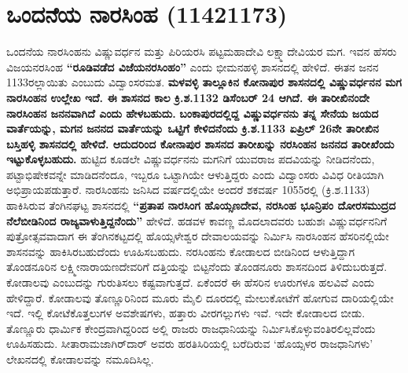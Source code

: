 \section{ಒಂದನೆಯ ನಾರಸಿಂಹ (11421173)}

ಒಂದನೆಯ ನಾರಸಿಂಹನು ವಿಷ್ಣುವರ್ಧನ ಮತ್ತು ಪಿರಿಯರಸಿ ಪಟ್ಟಮಹಾದೇವಿ ಲಕ್ಷ್ಮಾದೇವಿಯರ ಮಗ. ಇವನ ಹೆಸರು ವಿಜಯನರಸಿಂಹ \textbf{“ರೂಡಿವಡೆದ ವಿಜೆಯನರಸಿಂಹಂ”} ಎಂದು ಭೀಮನಹಳ್ಳಿ ಶಾಸನದಲ್ಲಿ ಹೇಳಿದೆ. ಈತನ ಜನನ 1133ರಲ್ಲಾಯಿತು ಎಂಬುದು ವಿದ್ವಾಂಸರಮತ. \textbf{ಮಳವಳ್ಳಿ ತಾಲ್ಲೂಕಿನ ಕೋನಾಪುರ ಶಾಸನದಲ್ಲಿ ವಿಷ್ಣುವರ್ಧನನ ಮಗ ನಾರಸಿಂಹನ ಉಲ್ಲೇಖ ಇದೆ. ಈ ಶಾಸನದ ಕಾಲ ಕ್ರಿ.ಶ.1132 ಡಿಸೆಂಬರ್​ 24 ಆಗಿದೆ. ಈ ತಾರೀಖಿನಂದೇ ನಾರಸಿಂಹನ ಜನನವಾಗಿದೆ ಎಂದು ಹೇಳಬಹುದು.} \textbf{ಬಂಕಾಪುರದಲ್ಲಿದ್ದ ವಿಷ್ಣುವರ್ಧನನು ತನ್ನ ಸೇನೆಯ ಜಯದ ವಾರ್ತೆಯನ್ನು, ಮಗನ ಜನನದ ವಾರ್ತೆಯನ್ನು ಒಟ್ಟಿಗೆ ಕೇಳಿದನೆಂದು ಕ್ರಿ.ಶ.1133 ಏಪ್ರಿಲ್​ 26ನೇ ತಾರೀಖಿನ ಬಸ್ತಿಹಳ್ಳಿ ಶಾಸನದಲ್ಲಿ ಹೇಳಿದೆ. ಆದುದರಿಂದ ಕೋನಾಪುರ ಶಾಸನದ ತಾರೀಖನ್ನು ನರಸಿಂಹನ ಜನನದ ತಾರೀಖೆಂದು ಇಟ್ಟುಕೊಳ್ಳಬಹುದು.} ಹುಟ್ಟಿದ ಕೂಡಲೇ ವಿಷ್ಣುವರ್ಧನನು ಮಗನಿಗೆ ಯುವರಾಜ ಪದವಿಯನ್ನು ನೀಡಿದನೆಂದು, ಪಟ್ಟಾಭಿಷೇಕವನ್ನೇ ಮಾಡಿದನೆಂದೂ, ಇಬ್ಬರೂ ಒಟ್ಟಾಗಿಯೇ ಆಳುತ್ತಿದ್ದರು ಎಂದು ವಿದ್ವಾಂಸರು ವಿವಿಧ ರೀತಿಯಾಗಿ ಅಭಿಪ್ರಾಯಪಡುತ್ತಾರೆ. ನಾರಸಿಂಹನು ಜನಿಸಿದ ವರ್ಷದಲ್ಲಿಯೇ ಅಂದರೆ ಶಕವರ್ಷ 1055ರಲ್ಲಿ (ಕ್ರಿ.ಶ.1133) ಹಾಕಿಸಿರುವ ತೆಂಗಿನಘಟ್ಟ ಶಾಸನದಲ್ಲಿ \textbf{“ಪ್ರತಾಪ ನಾರಸಿಂಗ ಹೊಯ್ಸಣದೇವ, ನರಸಿಂಹ ಭೂನ್ರಿಪಂ ದೋರಸಮುದ್ರದ ನೆಲೆಬೀಡಿನಿಂದ ರಾಜ್ಯವಾಳುತ್ತಿದ್ದನೆಂದು”} ಹೇಳಿದೆ. ಹಡವಳ ಕಾವಣ್ಣ ಮೊದಲಾದವರು ಬಹುಶಃ ವಿಷ್ಣುವರ್ಧನನಿಗೆ ಪುತ್ರೋತ್ಸವವಾದಾಗ ಈ ತೆಂಗಿನಕಟ್ಟದಲ್ಲಿ ಹೊಯ್ಸಳೇಶ್ವರ ದೇವಾಲಯವನ್ನು ನಿರ್ಮಿಸಿ ನಾರಸಿಂಹನ ಹೆಸರಿನಲ್ಲಿಯೇ ಶಾಸನವನ್ನು ಹಾಕಿಸಿರಬಹುದೆಂದು ಊಹಿಸಬಹುದು. ನರಸಿಂಹನು ಕೋಡಾಲದ ಬೀಡಿನಿಂದ ಆಳುತ್ತಿದ್ದಾಗ ತೊಂಡನೂರಿನ ಲಕ್ಷ್ಮೀನಾರಾಯಣದೇವರಿಗೆ ದತ್ತಿಯನ್ನು ಬಿಟ್ಟನೆಂದು ತೊಂಡನೂರು ಶಾಸನದಿಂದ ತಿಳಿದುಬರುತ್ತದೆ. ಕೋಡಾಲವು ಎಂಬುದನ್ನು ಗುರುತಿಸಲು ಕಷ್ಟವಾಗುತ್ತದೆ. ಏಕೆಂದರೆ ಈ ಹೆಸರಿನ ಊರುಗಳೂ ಹಲವಿವೆ ಎಂದು ಹೇಳಿದ್ದಾರೆ. ಕೋಡಾಲವು ತೊಣ್ಣೂರಿನಿಂದ ಮೂರು ಮೈಲಿ ದೂರದಲ್ಲಿ ಮೇಲುಕೋಟೆಗೆ ಹೋಗುವ ದಾರಿಯಲ್ಲಿಯೇ ಇದೆ. ಇಲ್ಲಿ ಕೋಟೆಕೊತ್ತಲುಗಳ ಅವಶೇಷಗಳು, ಹತ್ತಾರು ವೀರಗಲ್ಲುಗಳು ಇವೆ. ಇದೇ ಕೋಡಾಲದ ಬೀಡು. ತೊಣ್ಣೂರು ಧಾರ್ಮಿಕ ಕೇಂದ್ರವಾಗಿದ್ದರಿಂದ ಅಲ್ಲಿ ರಾಜರು ರಾಜಧಾನಿಯನ್ನು ನಿರ್ಮಿಸಿಕೊಳ್ಳುವಂತಿರ\-ಲಿಲ್ಲವೆಂದು ಊಹಿಸಹುದು. ಸೀತಾರಾಮಜಾಗಿರ್​ದಾರ್​ ಅವರು ಹರತಿಸಿರಿಯಲ್ಲಿ ಬರೆದಿರುವ ‘ಹೊಯ್ಸಳರ ರಾಜಧಾನಿಗಳು’ ಲೇಖನದಲ್ಲಿ ಕೋಡಾಲವನ್ನು ನಮೂದಿಸಿಲ್ಲ.

